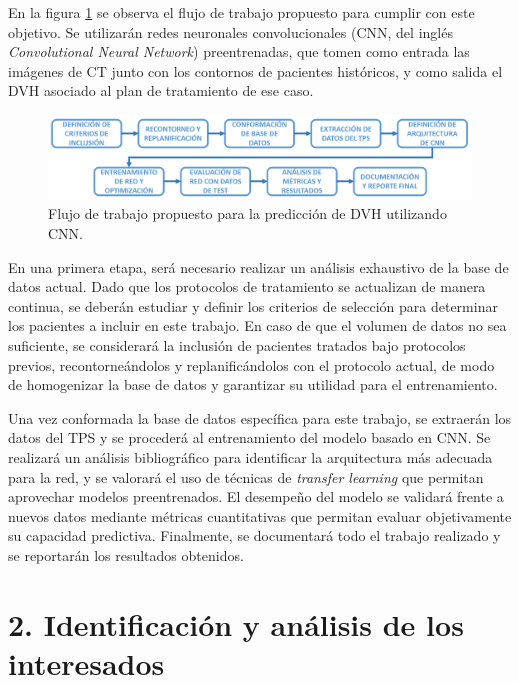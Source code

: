 \documentclass[
11pt, %
codirector, %
]{charter}
\begin{document}
En la figura \ref{fig:DiagBloques} se observa el flujo de trabajo propuesto para cumplir con este objetivo. Se utilizarán redes neuronales convolucionales (CNN, del inglés \textit{Convolutional Neural Network}) preentrenadas, que tomen como entrada las imágenes de CT junto con los contornos de pacientes históricos, y como salida el DVH asociado al plan de tratamiento de ese caso. 

\vspace{10px}

\begin{figure}[!htpb]
\centering 
\includegraphics[width=1\textwidth]{./Figuras/Fig2-DiagramaBloques.png}
\caption{Flujo de trabajo propuesto para la predicción de DVH utilizando CNN.}
\label{fig:DiagBloques}
\end{figure}

\vspace{15px}

En una primera etapa, será necesario realizar un análisis exhaustivo de la base de datos actual. Dado que los protocolos de tratamiento se actualizan de manera continua, se deberán estudiar y definir los criterios de selección para determinar los pacientes a incluir en este trabajo. En caso de que el volumen de datos no sea suficiente, se considerará la inclusión de pacientes tratados bajo protocolos previos, recontorneándolos y replanificándolos con el protocolo actual, de modo de homogenizar la base de datos y garantizar su utilidad para el entrenamiento.

Una vez conformada la base de datos específica para este trabajo, se extraerán los datos del TPS y se procederá al entrenamiento del modelo basado en CNN. Se realizará un análisis bibliográfico para identificar la arquitectura más adecuada para la red, y se valorará el uso de técnicas de \textit{transfer learning} que permitan aprovechar modelos preentrenados. El desempeño del modelo se validará frente a nuevos datos mediante métricas cuantitativas que permitan evaluar objetivamente su capacidad predictiva. Finalmente, se documentará todo el trabajo realizado y se reportarán los resultados obtenidos.

\section{2. Identificación y análisis de los interesados}
\label{sec:interesados}
\end{document}
